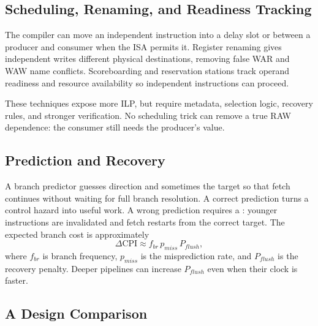 \documentclass[11pt]{article}
\begin{document}
\subsection{Scheduling, Renaming, and Readiness Tracking}

The compiler can move an independent instruction into a delay slot or between
a producer and consumer when the ISA permits it. Register renaming gives
independent writes different physical destinations, removing false WAR and
WAW name conflicts. Scoreboarding and reservation stations track operand
readiness and resource availability so independent instructions can proceed.

These techniques expose more ILP, but require metadata, selection logic,
recovery rules, and stronger verification. No scheduling trick can remove a
true RAW dependence: the consumer still needs the producer's value.

\subsection{Prediction and Recovery}

A branch predictor guesses direction and sometimes the target so that fetch
continues without waiting for full branch resolution. A correct prediction
turns a control hazard into useful work. A wrong prediction requires a
: younger instructions are invalidated and fetch restarts from the
correct target. The expected branch cost is approximately
\[
  \Delta\mathrm{CPI}\approx f_{br}\,p_{miss}\,P_{flush},
\]
where $f_{br}$ is branch frequency, $p_{miss}$ is the misprediction rate, and
$P_{flush}$ is the recovery penalty. Deeper pipelines can increase
$P_{flush}$ even when their clock is faster.

\subsection{A Design Comparison}
\end{document}
